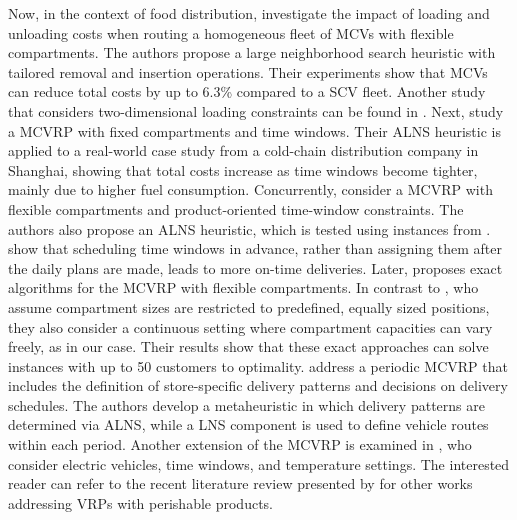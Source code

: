 \documentclass[11pt]{elsarticle}
\theoremstyle{plain}
\newcommand{\blue}[1]{#1}
\begin{document}
Now, in the context of food distribution, \cite{hubner2019multi} investigate the impact
of loading and unloading costs when routing a homogeneous fleet of \acp{MCV} with flexible compartments. The authors propose a large neighborhood search heuristic with tailored removal and insertion operations. Their experiments show that \acp{MCV} can reduce total costs by up to 6.3\% compared to a \ac{SCV} fleet. Another study that considers two-dimensional loading constraints can be found in \cite{ostermeier2018loading}.
Next, \cite{chen2019multi} study a \ac{MCVRP} with \blue{fixed compartments and} time windows. Their \blue{\ac{ALNS}} heuristic is applied to a real-world case study from a cold-chain distribution company in Shanghai, showing that total costs increase as time windows become tighter, mainly due to higher fuel consumption.
Concurrently, \cite{Martins2019} consider a \ac{MCVRP} with \blue{flexible compartments and} product-oriented time-window constraints. The authors also propose an \ac{ALNS} heuristic, which is tested using instances from \cite{kovacs2014template}. \cite{Martins2019} show that scheduling time windows in advance, rather than assigning them after the daily plans are made, leads to more on-time deliveries. 
Later, \blue{\cite{hessler2021exact} proposes exact algorithms for the \ac{MCVRP} with flexible compartments. In contrast to \cite{henke2015multi}, who assume compartment sizes are restricted to predefined, equally sized positions, they also consider a continuous setting where compartment capacities can vary freely, as in our case. Their results show that these exact approaches can solve instances with up to 50 customers to optimality. \cite{frank2021optimizing} address a periodic \ac{MCVRP} that includes the definition of store-specific delivery patterns and decisions on delivery schedules. The authors develop a metaheuristic in which delivery patterns are determined via \ac{ALNS}, while a \ac{LNS} component is used to define vehicle routes within each period. Another extension of the \ac{MCVRP} is examined in \cite{wang2023multi}, who consider electric vehicles, time windows, and temperature settings.}
The interested reader can refer to the recent literature review presented by \cite{guerriero2025vehicle} for other works addressing \acp{VRP} with perishable products.
\end{document}
